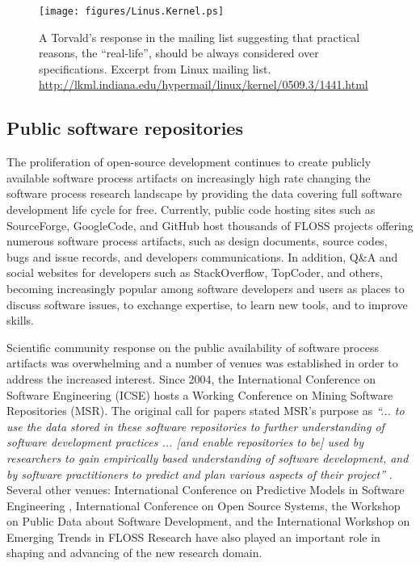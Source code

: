 \begin{figure}[ht!]
   \centering
   \texttt{[image: figures/Linus.Kernel.ps]}
   \caption{A Torvald's response in the mailing list suggesting that practical reasons, the ``real-life'', 
   should be always considered over specifications.
   Excerpt from Linux mailing list. \url{http://lkml.indiana.edu/hypermail/linux/kernel/0509.3/1441.html}}
   \label{fig:kernel}
\end{figure}

\subsection{Public software repositories}
The proliferation of open-source development continues to create publicly available software process 
artifacts on increasingly high rate changing the software process research landscape by providing 
the data covering full software development life cycle for free. 
Currently, public code hosting sites such as SourceForge, GoogleCode, and GitHub host thousands of FLOSS 
projects offering numerous software process artifacts, such as design documents, source codes, bugs and 
issue records, and developers communications.
In addition, Q\&A and social websites for developers such as StackOverflow, TopCoder, and others, becoming 
increasingly popular among software developers and users as places to discuss software issues, 
to exchange expertise, to learn new tools, and to improve skills.

Scientific community response on the public availability of software process artifacts was overwhelming 
and a number of venues was established in order to address the increased interest. 
Since 2004, the International Conference on Software Engineering (ICSE) hosts a Working Conference on 
Mining Software Repositories (MSR). The original call for papers stated MSR's purpose as 
\textit{``... to use the data stored in these software repositories to further understanding of software 
development practices ... [and enable repositories to be] used by researchers to gain empirically based 
understanding of software development, and by software practitioners to predict and plan various aspects 
of their project''} \cite{msr2004} \cite{citeulike:7853299}. 
Several other venues: International Conference on Predictive Models in Software Engineering \cite{promise12}, 
International Conference on Open Source Systems, the Workshop on Public Data about Software Development, 
and the International Workshop on Emerging Trends in FLOSS Research have also played
an important role in shaping and advancing of the new research domain.


